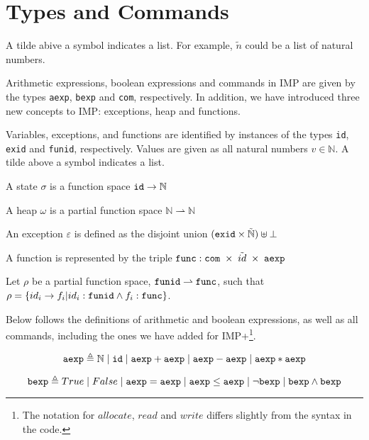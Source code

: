 
\section{Types and Commands}

\begin{notation}
A tilde abive a symbol indicates a list. For example, $\tilde{n}$ could be a list of natural numbers.
\end{notation}

Arithmetic expressions, boolean expressions and commands in IMP are given by the types \verb|aexp|, \verb|bexp| and \verb|com|, respectively. In addition, we have introduced three new concepts to IMP: exceptions, heap and functions.

Variables, exceptions, and functions are identified by instances of the types \verb|id|, \verb|exid| and \verb|funid|, respectively. Values are given as all natural numbers $v\in\mathbb{N}$. A tilde above a symbol indicates a list.

A state $\sigma$ is a function space $\verb|id| \rightarrow \mathbb{N}$

A heap $\omega$ is a partial function space $\mathbb{N} \rightharpoonup \mathbb{N}$

An exception $\varepsilon$ is defined as the disjoint union $(\verb|exid|\times\tilde{\mathbb{N}})\uplus\bot$

A function is represented by the triple $\verb|func|: \verb|com| \; \times \; \tilde{id} \; \times \; \verb|aexp|$

Let $\rho$ be a partial function space, 
$\verb|funid| \rightharpoonup \verb|func|$, 
such that 
$\rho = \{ id_i \rightarrow f_i | id_i : \verb|funid| \wedge f_i:\verb|func| \}$.

Below follows the definitions of arithmetic and boolean expressions, as well as all commands, including the ones we have added for IMP+\footnote{The notation for $allocate$, $read$ and $write$ differs slightly from the syntax in the code.}.

\begin{equation}
\verb|aexp| \triangleq \mathbb{N} \;|\; \verb|id| \;|\; \verb|aexp| + \verb|aexp| \;|\;  \verb|aexp| - \verb|aexp| \;|\;  \verb|aexp| * \verb|aexp|
\end{equation}

\begin{equation}
\verb|bexp| \triangleq True \;|\; False \;|\; \verb|aexp| = \verb|aexp| \;|\; \verb|aexp| \leq \verb|aexp| \;|\; \neg\verb|bexp| \;|\; \verb|bexp| \wedge \verb|bexp|
\end{equation}

